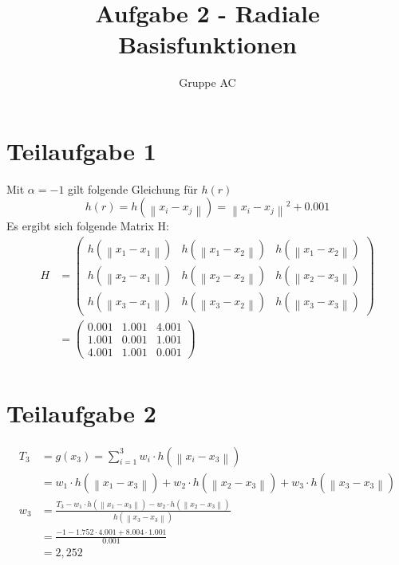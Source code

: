 \documentclass[a4paper, 11pt]{article}
\title{\textbf{Aufgabe 2 - Radiale Basisfunktionen}}
\author{Gruppe AC}
\begin{document}
\maketitle

\section*{Teilaufgabe 1}
Mit $\alpha=-1$ gilt folgende Gleichung für $h(r)$
\[
h(r) = h( \left\lVert x_i - x_j \right\rVert) = \left\lVert x_i - x_j \right\rVert ^2 + 0.001
\]
Es ergibt sich folgende Matrix H:
\begin{align*}
H &= \left( \begin{array}{ccc}
h( \left\lVert x_1 - x_1 \right\rVert) & h( \left\lVert x_1 - x_2 \right\rVert) & h( \left\lVert x_1 - x_2 \right\rVert) \\
h( \left\lVert x_2 - x_1 \right\rVert) & h( \left\lVert x_2 - x_2 \right\rVert) & h( \left\lVert x_2 - x_3 \right\rVert) \\
h( \left\lVert x_3 - x_1 \right\rVert) & h( \left\lVert x_3 - x_2 \right\rVert) & h( \left\lVert x_3 - x_3 \right\rVert)
\end{array} \right) \\
 &= \left( \begin{array}{ccc}
0.001 & 1.001 & 4.001 \\
1.001 & 0.001 & 1.001 \\
4.001 & 1.001 & 0.001
\end{array} \right) \\
\end{align*}


\section*{Teilaufgabe 2}
\begin{align*}
	T_3 &= g(x_3) = \sum_{i=1}^3 w_i \cdot h(\left\lVert x_i - x_3 \right\rVert) \\
	    &= w_1 \cdot h(\left\lVert x_1 - x_3 \right\rVert) + w_2 \cdot h(\left\lVert x_2 - x_3 \right\rVert) + w_3 \cdot h(\left\lVert x_3 - x_3 \right\rVert) \\
	w_3 &= \frac{T_3 - w_1 \cdot h(\left\lVert x_1 - x_3 \right\rVert) - w_2 \cdot h(\left\lVert x_2 - x_3 \right\rVert)}{h(\left\lVert x_3 - x_3 \right\rVert)} \\
		&= \frac{-1 - 1.752 \cdot 4.001 + 8.004 \cdot 1.001}{0.001} \\
		& = 2,252
\end{align*}
\end{document}
